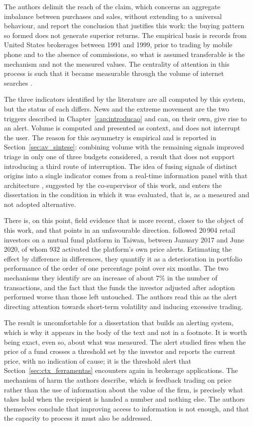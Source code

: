 The authors delimit the reach of the claim, which concerns an aggregate imbalance between purchases
and sales, without extending to a universal behaviour, and report the conclusion that justifies this work: the
buying pattern so formed does not generate superior returns. The empirical basis is records from
United States brokerages between 1991 and 1999, prior to trading by mobile phone and to the absence
of commissions, so what is assumed transferable is the mechanism and not the measured values. The
centrality of attention in this process is such that it became measurable through the volume of
internet searches \autocite{da2011attention}.

The three indicators identified by the literature are all computed by this system, but the status
of each differs. News and the extreme movement are the two triggers described in
Chapter~\ref{cap:introducao} and can, on their own, give rise to an alert. Volume is computed and
presented as context, and does not interrupt the user. The reason for this asymmetry is empirical
and is reported in Section~\ref{sec:av_sintese}: combining volume with the remaining signals
improved triage in only one of three budgets considered, a result that does not support introducing
a third route of interruption. The idea of fusing signals of distinct origins into a single
indicator comes from a real-time information panel with that architecture
\autocite{worldmonitor2026}, suggested by the co-supervisor of this work, and enters the
dissertation in the condition in which it was evaluated, that is, as a measured and not adopted
alternative.

There is, on this point, field evidence that is more recent, closer to the object of this work, and
that points in an unfavourable direction. \textcite{liu2023alerts} followed 20\,904 retail
investors on a mutual fund platform in Taiwan, between January 2017 and June 2020, of whom 932
activated the platform's own price alerts. Estimating the effect by difference in differences, they
quantify it as a deterioration in portfolio performance of the order of one percentage point over
six months. The two mechanisms they identify are an increase of about 7\% in the number of
transactions, and the fact that the funds the investor adjusted after adoption performed worse than
those left untouched. The authors read this as the alert directing attention towards short-term
volatility and inducing excessive trading.

The result is uncomfortable for a dissertation that builds an alerting system, which is why it
appears in the body of the text and not in a footnote. It is worth being exact, even so, about what
was measured. The alert studied fires when the price of a fund crosses a threshold set by the
investor and reports the current price, with no indication of cause; it is the threshold alert that
Section~\ref{sec:ctx_ferramentas} encounters again in brokerage applications. The mechanism of harm
the authors describe, which is feedback trading on price rather than the use of information about
the value of the firm, is precisely what takes hold when the recipient is handed a number and
nothing else. The authors themselves conclude that improving access to information is not enough,
and that the capacity to process it must also be addressed.

